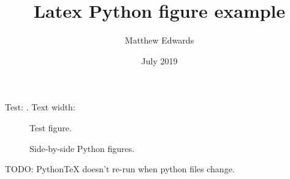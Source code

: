 \documentclass[12pt,a4paper]{article}
\begin{document}
	\title{Latex Python figure example}
	\author{Matthew Edwards}
	\date{July 2019}
	\maketitle

	Test: . Text width: 

	\begin{figure}
		\caption{Test figure.}
		\label{fig:test}
	\end{figure}

	\begin{figure}
		\centering
		\caption{Side-by-side Python figures.}
		\label{fig:test2}
	\end{figure}

	TODO: PythonTeX doesn't re-run when python files change.
\end{document}
